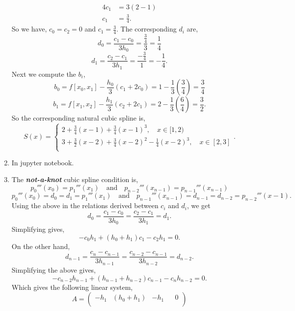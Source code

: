 \documentclass{report}
\begin{document}
\begin{solution}
\begin{enumerate}[label=(\alph*)]
\begin{align*}
			      4c_1                                             & =   3(2-1) \\
			      c_1                                              & =   \frac{3}{4}
			      .\end{align*}
		      So we have, $c_0 =c_2 =0$ and $c_1=\frac{3}{4}$.
		      The corresponding $d_i$ are,
		      \[
			      d_0 = \frac{c_1-c_0}{3h_{0}} = \frac{\frac{3}{4}}{3} = \frac{1}{4}
		      \]
		      \[
			      d_1 = \frac{c_2-c_1}{3h_{1}} = \frac{-\frac{3}{4}}{1} = -\frac{1}{4}
			      .\]
		      Next we compute the $b_{i}$,
		      \[
			      b_{0} = f[x_{0},x_1] - \frac{h_{0}}{3} \left( c_1+2c_0 \right) = 1- \frac{1}{3} \left(\frac{3}{4}  \right) =\frac{3}{4}
		      \]
		      \[
			      b_{1} = f[x_{1},x_2] - \frac{h_{1}}{3} \left( c_2+2c_1 \right) = 2- \frac{1}{3} \left(\frac{6}{4}  \right) =\frac{3}{2}
			      .    \]
		      So the corresponding natural cubic spline is,
		      \[
			      S(x)=  \begin{cases}
				      2+\frac{3}{4}(x-1) + \frac{3}{4}(x-1)^3 , \quad x\in[1,2)                 \\
				      3+\frac{3}{2}(x-2)+\frac{3}{4}(x-2)^2-\frac{1}{4}(x-2)^3, \quad x\in[2,3] \\
			      \end{cases}
			      .\]
		\item In jupyter notebook.
		\item The \emph{\bfseries not-a-knot} cubic spline condition is,
		      \[
			      p_0'''(x_0) = p_1'''(x_1) \quad \text{and} \quad p_{n-2}'''(x_{n-1}) = p_{n-1}'''(x_{n-1})
		      \]
		      \[
			      p_0'''(x_0) = d_0 = d_1 = p_1'''(x_1) \quad \text{and} \quad p_{n-1}'''(x_{n-1}) = d_{n-1} = d_{n-2} = p_{n-2}''' (x-1)
			      . \]
		      Using the above in the relations derived between $c_{i}$ and $d_{i}$, we get
		      \[
			      d_0 = \frac{c_1-c_0}{3h_{0}} = \frac{c_{2}-c_{1}}{3h_{1}} = d_{1}
			      .\]
		      Simplifying gives,
		      \[
			      -c_{0}h_1 + (h_0+h_1)c_{1} -c_{2}h_{1} = 0
			      .\]
		      On the other hand,
		      \[
			      d_{n-1} = \frac{c_{n} - c_{n-1}}{3h_{n-1}} = \frac{c_{n-2}-c_{n-1}}{3h_{n-2}} = d_{n-2}
			      .\]
		      Simplifying the above gives,
		      \[
			      -c_{n-2}h_{n-1} + (h_{n-1}+h_{n-2})c_{n-1} -c_{n}h_{n-2} = 0
			      .\]
		      Which gives the following linear system,
		      \[
			      A = \begin{pmatrix}
				      -h_1 & (h_0+h_1)  & -h_1     &                     & 0       \\

\end{pmatrix}\]
\end{enumerate}
\end{solution}
\end{document}
